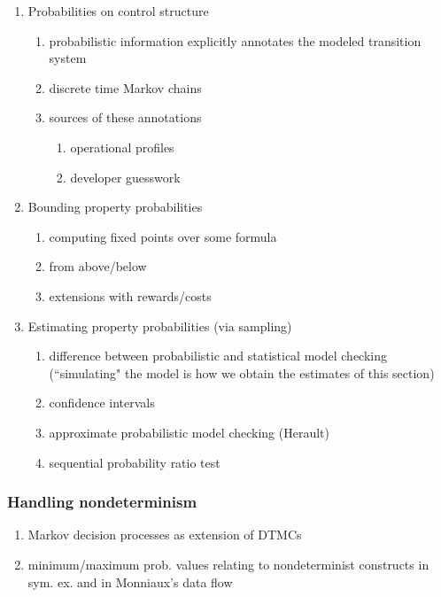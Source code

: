   \begin{enumerate}

   \item Probabilities on control structure
     \begin{enumerate}
      \item probabilistic information explicitly annotates the modeled 
            transition system
      \item discrete time Markov chains
      \item sources of these annotations
        \begin{enumerate}
         \item operational profiles
         \item developer guesswork
        \end{enumerate}
     \end{enumerate}

   \item Bounding property probabilities
     \begin{enumerate}
       \item computing fixed points over some formula
       \item from above/below
       \item extensions with rewards/costs
     \end{enumerate}

   \item Estimating property probabilities (via sampling)
     \begin{enumerate}
      \item difference between probabilistic and statistical model checking
            (``simulating" the model is how we obtain the estimates of this section)
      \item confidence intervals
      \item approximate probabilistic model checking (Herault)
      \item sequential probability ratio test 
     \end{enumerate}

  \end{enumerate}

\subsubsection{Handling nondeterminism}
     \begin{enumerate}
      \item Markov decision processes as extension of DTMCs
      \item minimum/maximum prob. values relating to nondeterminist
            constructs in sym. ex. and in Monniaux's data flow
     \end{enumerate}


